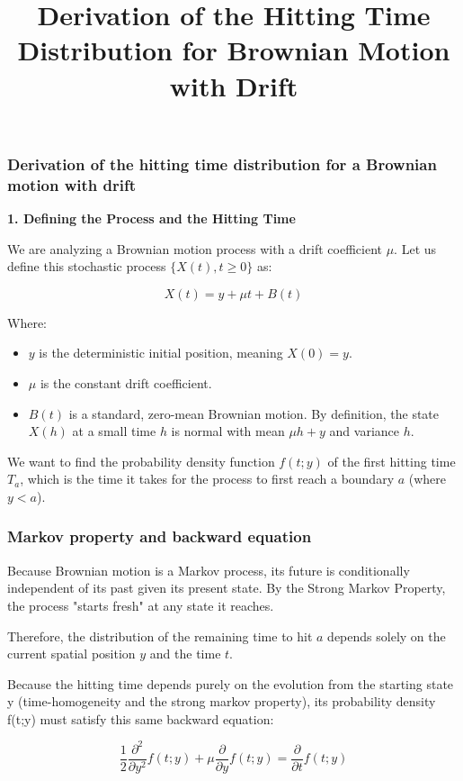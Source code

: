 \documentclass{beamer}
\title{Derivation of the Hitting Time Distribution for Brownian Motion with Drift}
\author{}
\date{}
\begin{document}
\begin{frame}
  \titlepage
\end{frame}

\begin{frame}
\frametitle{Derivation of the hitting time distribution for a Brownian motion with drift}
\textbf{1. Defining the Process and the Hitting Time}

We are analyzing a Brownian motion process with a drift coefficient $\mu$. Let us define this stochastic process $\{X(t), t \geq 0\}$ as:

\[
X(t) = y + \mu t + B(t)
\]

Where:

\begin{itemize}
  \item $y$ is the deterministic initial position, meaning $X(0) = y$.
  \item $\mu$ is the constant drift coefficient.
  \item $B(t)$ is a standard, zero-mean Brownian motion. By definition, the state $X(h)$ at a small time $h$ is normal with mean $\mu h + y$ and variance $h$.
\end{itemize}

We want to find the probability density function $f(t; y)$ of the first hitting time $T_a$, which is the time it takes for the process to first reach a boundary $a$ (where $y < a$).
\end{frame}

\begin{frame}
\frametitle{Markov property and backward equation}
Because Brownian motion is a Markov process, its future is conditionally independent of its past given its present state. By the Strong Markov Property, the process "starts fresh" at any state it reaches. 

\vspace{0.2cm}

Therefore, the distribution of the remaining time to hit $a$ depends solely on the current spatial position $y$ and the time $t$.

\vspace{0.2cm}

Because the hitting time depends purely on the evolution from the starting state 
y (time-homogeneity and the strong markov property), its probability density f(t;y) must satisfy this same backward equation:

\[
\frac{1}{2} \frac{\partial^2}{\partial y^2} f(t;y) + \mu \frac{\partial}{\partial y} f(t;y) = \frac{\partial}{\partial t} f(t;y)
\]
\end{frame}
\end{document}
